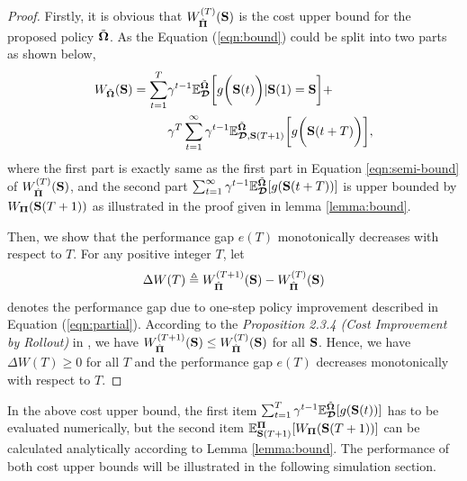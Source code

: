 \begin{proof}
    Firstly, it is obvious that $W^{(T)}_{\hat{\mathbf{\Pi}}}(\mathbf{S})$ is the cost upper bound for the proposed policy $\tilde{\boldsymbol{\Omega}}$.
    As the Equation (\ref{eqn:bound}) could be split into two parts as shown below,
    \begin{align*}
        W_{\tilde{\boldsymbol{\Omega}}}(\mathbf{S}) =
        \sum_{t=1}^{T} &\gamma^{t-1} \mathbb{E}^{\tilde{\boldsymbol{\Omega}}}_{\boldsymbol{\mathcal{D}}} \bigg[ g\bigg(\mathbf{S}(t)\bigg) | \mathbf{S}(1)=\mathbf{S} \bigg]
        +
        \nonumber\\
        &\gamma^{T} \sum_{t=1}^{\infty} \gamma^{t-1} \mathbb{E}^{\tilde{\boldsymbol{\Omega}}}_{\boldsymbol{\mathcal{D}},\mathbf{S}(T+1)} \bigg[ g\bigg(\mathbf{S}(t+T)\bigg) \bigg],
    \end{align*}
    where the first part is exactly same as the first part in Equation \eqref{eqn:semi-bound} of $W^{(T)}_{\hat{\mathbf{\Pi}}}(\mathbf{S})$, and the second part $\sum_{t=1}^{\infty}\gamma^{t-1}\mathbb{E}^{\tilde{\boldsymbol{\Omega}}}_{\boldsymbol{\mathcal{D}}}[g(\mathbf{S}(t+T))]$ is upper bounded by $W_{\mathbf{\Pi}}(\mathbf{S}(T+1))$ as illustrated in the proof given in lemma \ref{lemma:bound}.

    Then, we show that the performance gap $e(T)$ monotonically decreases with respect to $T$.
    For any positive integer $T$, let
    \begin{align*}
        \Delta{W}(T) \triangleq W^{(T+1)}_{\hat{\mathbf{\Pi}}}(\mathbf{S}) - W^{(T)}_{\hat{\mathbf{\Pi}}}(\mathbf{S})
    \end{align*}
    denotes the performance gap due to one-step policy improvement described in Equation (\ref{eqn:partial}).
    According to the \emph{Proposition 2.3.4 (Cost Improvement by Rollout)} in \cite{dp-control}, we have $W^{(T+1)}_{\hat{\mathbf{\Pi}}}(\mathbf{S}) \leq W^{(T)}_{\hat{\mathbf{\Pi}}}(\mathbf{S})$ for all $\mathbf{S}$.
    Hence, we have $\Delta{W}(T) \geq 0$ for all $T$ and the performance gap $e(T)$ decreases monotonically with respect to $T$.
\end{proof}
In the above cost upper bound, the first item $\sum_{t=1}^{T} \gamma^{t-1} \mathbb{E}^{\tilde{\boldsymbol{\Omega}}}_{\boldsymbol{\mathcal{D}}}[g(\mathbf{S}(t))]$ has to be evaluated numerically, but the second item $\mathbb{E}^{\mathbf{\Pi}}_{\mathbf{S}(T+1)}[{W_{\mathbf{\Pi}}(\mathbf{S}(T+1))}]$ can be calculated analytically according to Lemma \ref{lemma:bound}.
The performance of both cost upper bounds will be illustrated in the following simulation section.


